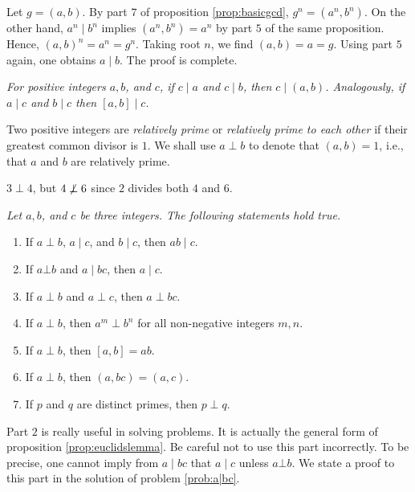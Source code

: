 \documentclass{subfile}
\begin{document}
	\begin{solution}
		Let $g=(a,b)$. By part $7$ of proposition \eqref{prop:basicgcd}, $g^n = (a^n,b^n)$. On the other hand, $a^n\mid b^n$ implies $(a^n, b^n)=a^n$ by part $5$ of the same proposition. Hence, $(a, b)^n=a^n=g^n$. Taking root $n$, we find $(a,b)=a=g$. Using part $5$ again, one obtains $a\mid b$. The proof is complete.

	\end{solution}

	\begin{proposition}\slshape\label{prop:dividegcd}
		For positive integers $a, b$, and $c$, if $c \mid a$ and $c\mid b$, then $c\mid (a,b)$. Analogously, if $a\mid c$ and $b\mid c$ then $[a,b]\mid c$.
	\end{proposition}

	\begin{definition}
		Two positive integers are \textit{relatively prime} or \textit{relatively prime to each other} if their greatest common divisor is $1$. We shall use $a\perp b$ to denote that $(a,b)=1$, i.e., that $a$ and $b$ are relatively prime.
	\end{definition}

	\begin{example}
		$3\perp4$, but $4\centernot\perp6$ since $2$ divides both $4$ and $6$.
	\end{example}

	\begin{proposition}\slshape\label{prop:cpdiv}
		Let $a, b$, and $c$ be three integers. The following statements hold true.
		\begin{enumerate}
			\item If $a\perp b$, $a\mid c$, and $b\mid c$, then $ab\mid c$.
			\item If $a \bot b$ and $a\mid bc$, then $a\mid c$.
			\item If $a\perp b$ and $a\perp c$, then $a\perp bc$.
			\item If $a\perp b$, then $a^m\perp b^n$ for all non-negative integers $m,n$.
			\item If $a \perp b$, then $[a,b]=ab$.
			\item If $a \perp b$, then $(a,bc)=(a,c)$.
			\item If $p$ and $q$ are distinct primes, then $p \perp q$.
		\end{enumerate}
	\end{proposition}

	\begin{note}[1]
		Part $2$ is really useful in solving problems. It is actually the general form of proposition \eqref{prop:euclidslemma}. Be careful not to use this part incorrectly. To be precise, one cannot imply from $a\mid bc$ that $a\mid c$ unless $a \bot b$. We state a proof to this part in the solution of problem \eqref{prob:a|bc}.
	\end{note}
\end{document}
